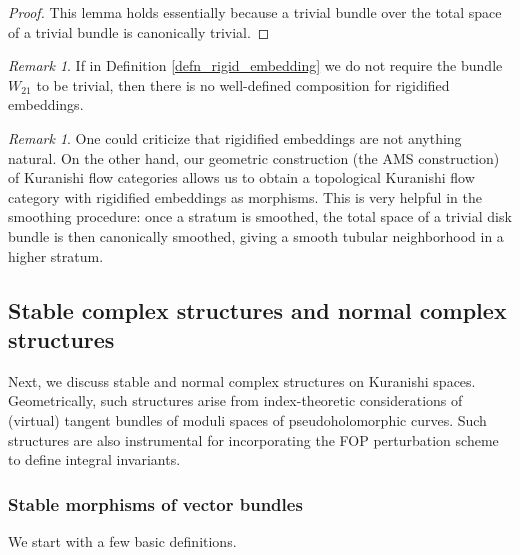 \documentclass[reqno, 10pt]{amsart}
\numberwithin{equation}{section}
\numberwithin{equation}{section}
\theoremstyle{definition}
\theoremstyle{remark}
\newtheorem{rem}[thm]{Remark}
\begin{document}
\begin{proof}
This lemma holds essentially because a trivial bundle over the total space of a trivial bundle is canonically trivial. 
\end{proof}

\begin{rem}
If in Definition \ref{defn_rigid_embedding} we do not require the bundle $W_{21}$ to be trivial, then there is no well-defined composition for rigidified embeddings.
\end{rem}

\begin{rem}
One could criticize that rigidified embeddings are not anything natural. On the other hand, our geometric construction (the AMS construction) of Kuranishi flow categories allows us to obtain a topological Kuranishi flow category with rigidified embeddings as morphisms. This is very helpful in the smoothing procedure: once a stratum is smoothed, the total space of a trivial disk bundle is then canonically smoothed, giving a smooth tubular neighborhood in a higher stratum.
\end{rem}









\subsection{Stable complex structures and normal complex structures}
Next, we discuss stable and normal complex structures on Kuranishi spaces. Geometrically, such structures arise from index-theoretic considerations of (virtual) tangent bundles of moduli spaces of pseudoholomorphic curves. Such structures are also instrumental for incorporating the FOP perturbation scheme to define integral invariants.


\subsubsection{Stable morphisms of vector bundles}

We start with a few basic definitions. 
\end{document}
